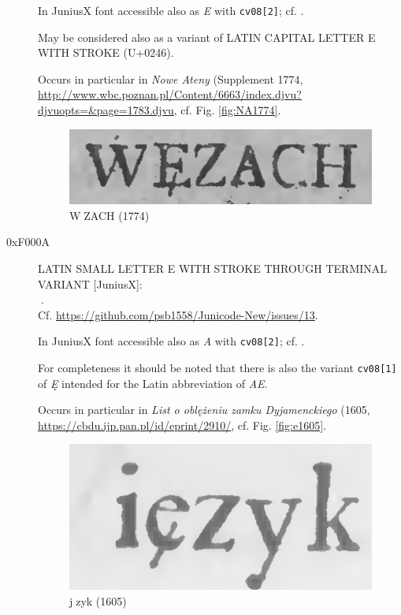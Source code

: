 \documentclass{article}
\newcommand{\Jglyph}[1]{{\relsize{2}\J#1}}
\begin{document}
\begin{description}
  In JuniusX font accessible also as \textit{E} with \texttt{cv08[2]};
  cf. \autocite[p. 7]{baker20:_opent_featur_junius_junius}.

 May be considered also as a variant of LATIN CAPITAL LETTER E WITH
 STROKE (U+0246).

 Occurs in particular in \textit{Nowe Ateny} (Supplement 1774,
 \url{http://www.wbc.poznan.pl/Content/6663/index.djvu?djvuopts=&page=1783.djvu},
 cf. Fig. \vref{fig:NA1774}.
 

  \begin{figure}[h]
    \includegraphics[width=1.3\textwidth]{img/00435077wezach}
    \caption{\J W󰀉ZACH (1774)}
    \label{fig:NA1774}
  \end{figure}

 \item [0xF000A] LATIN SMALL LETTER E WITH STROKE THROUGH TERMINAL VARIANT [JuniusX]:\\
  \Jglyph{󰀊}.\\ Cf. \url{https://github.com/psb1558/Junicode-New/issues/13}.

  In JuniusX font accessible also as \textit{A} with \texttt{cv08[2]};
  cf. \autocite[p. 7]{baker20:_opent_featur_junius_junius}.

  For completeness it should be noted that there is also the variant
  \texttt{cv08[1]} of \textit{Ę} intended for the Latin abbreviation
  of \textit{AE}.

 Occurs in particular in \textit{List o oblężeniu zamku Dyjamenckiego} (1605,
 \url{https://cbdu.ijp.pan.pl/id/eprint/2910/},
 cf. Fig. \vref{fig:e1605}.
 
  \begin{figure}[h]
    \includegraphics[width=1\hsize]{img/00436649jezyk}
    \caption{\J j󰀊zyk (1605)}
    \label{fig:e1605}
  \end{figure}


\end{description}
\end{document}
